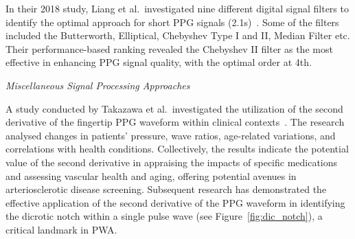 
In their 2018 study, Liang et al.\ investigated nine different digital signal filters to identify the optimal approach for short PPG signals (2.1s)~\cite{liangOptimalFilterShort2018}.
Some of the filters included the Butterworth, Elliptical, Chebyshev Type I and II, Median Filter etc.
Their performance-based ranking revealed the Chebyshev II filter as the most effective in enhancing PPG signal quality, with the optimal order at 4th.

\vspace{0.2cm}
\textit{Miscellaneous Signal Processing Approaches}
\vspace{0.2cm}

A study conducted by Takazawa et al.\ investigated the utilization of the second derivative of the fingertip PPG waveform within clinical contexts~\cite{takazawaAssessmentVasoactiveAgents1998}.
The research analysed changes in patients' pressure, wave ratios, age-related variations, and correlations with health conditions.
Collectively, the results indicate the potential value of the second derivative in appraising the impacts of specific medications and assessing vascular health and aging, offering potential avenues in arteriosclerotic disease screening.
Subsequent research has demonstrated the effective application of the second derivative of the PPG waveform in identifying the dicrotic notch within a single pulse wave (see Figure~\ref{fig:dic_notch}), a critical landmark in PWA\@.

